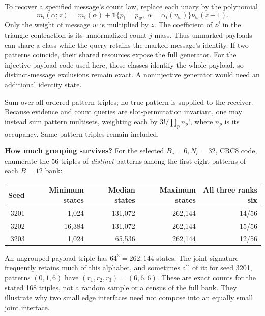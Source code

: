 \documentclass[10pt,a4paper]{article}
\newcommand{\ind}{\mathbf 1}
\begin{document}
To recover a specified message's count law, replace each unary by the polynomial
\[
 m_i(\alpha;z)=m_i(\alpha)+
 \ind\{p_i=p_w,\ \alpha=\alpha_i(v_w)\}\nu_w(z-1).
\]
Only the weight of message $w$ is multiplied by $z$. The coefficient of $z^j$ in the triangle contraction is
its unnormalized count-$j$ mass. Thus unmarked payloads can share a class while the query retains the marked
message's identity. If two patterns coincide, their shared resources expose the full generator. For the
injective payload code used here, these classes identify the whole payload, so distinct-message exclusions
remain exact. A noninjective generator would need an additional identity state.

Sum over all ordered pattern triples; no true pattern is supplied to the receiver. Because evidence and count
queries are slot-permutation invariant, one may instead sum pattern multisets, weighting each by
$3!/\prod_p n_p!$, where $n_p$ is its occupancy. Same-pattern triples remain included.

\textbf{How much grouping survives?} For the selected $B_c=6,N_c=32$, CRC8 code, enumerate the 56 triples of
\emph{distinct} patterns among the first eight patterns of each $B=12$ bank:
\begin{center}
\begin{tabular}{@{}rrrrr@{}}\toprule
Seed & Minimum states & Median states & Maximum states & All three ranks six\\\midrule
3201 & 1,024 & 131,072 & 262,144 & 14/56\\
3202 & 16,384 & 131,072 & 262,144 & 15/56\\
3203 & 1,024 & 65,536 & 262,144 & 12/56\\\bottomrule
\end{tabular}
\end{center}
An ungrouped payload triple has $64^3=262,144$ states. The joint signature frequently retains much of this
alphabet, and sometimes all of it: for seed 3201, patterns $(0,1,6)$ have $(r_1,r_2,r_3)=(6,6,6)$.
These are exact counts for the stated 168 triples, not a random sample or a census of the full bank.
They illustrate why two small edge interfaces need not compose into an equally small joint interface.

\clearpage
\end{document}
